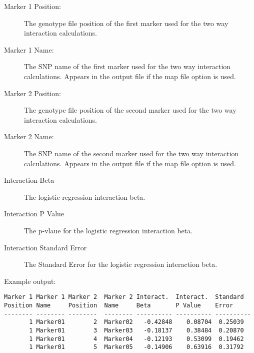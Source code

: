 \begin{description}
\item[Marker 1 Position:] The genotype file position of the first marker used
  for the two way interaction calculations.

\item[Marker 1 Name:] The SNP name of the first marker used for the two way
  interaction calculations.  Appears in the output file if the map file option
  is used.

\item[Marker 2 Position:] The genotype file position of the second marker used
  for the two way interaction calculations.

\item[Marker 2 Name:] The SNP name of the second marker used for the two way
  interaction calculations.  Appears in the output file if the map file option
  is used.

\item[Interaction Beta] The logistic regression interaction beta.

\item[Interaction P Value] The p-vlaue for the logistic regression interaction beta.

\item[Interaction Standard Error] The Standard Error for the logistic regression
  interaction beta.
\end{description}

\noindent{}Example output:
\begin{verbatim}
Marker 1 Marker 1 Marker 2  Marker 2 Interact.  Interact.  Standard  
Position Name     Position  Name     Beta       P Value    Error     
-------- -------- --------  -------- ---------- ---------- ----------
       1 Marker01        2  Marker02   -0.42848    0.08704  0.25039
       1 Marker01        3  Marker03   -0.18137    0.38484  0.20870
       1 Marker01        4  Marker04   -0.12193    0.53099  0.19462
       1 Marker01        5  Marker05   -0.14906    0.63916  0.31792
\end{verbatim}

